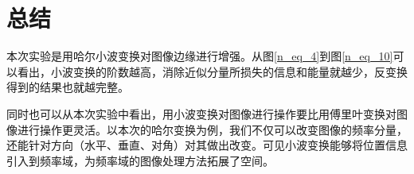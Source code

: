 \documentclass[UTF8]{ctexart}
\begin{document}
%                            
%                        
    
                            
                                   

	\section{总结}
		
        \indent 本次实验是用哈尔小波变换对图像边缘进行增强。从图\ref{n_eq_4}到图\ref{n_eq_10}可以看出，小波变换的阶数越高，消除近似分量所损失的信息和能量就越少，反变换得到的结果也就越完整。
        
        \indent 同时也可以从本次实验中看出，用小波变换对图像进行操作要比用傅里叶变换对图像进行操作更灵活。以本次的哈尔变换为例，我们不仅可以改变图像的频率分量，还能针对方向（水平、垂直、对角）对其做出改变。可见小波变换能够将位置信息引入到频率域，为频率域的图像处理方法拓展了空间。
        
		

		
	
	
%
%

\end{document}
